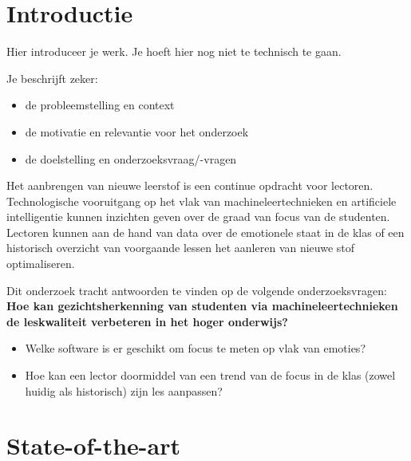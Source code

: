 
\section{Introductie} %
\label{sec:introductie}

Hier introduceer je werk. Je hoeft hier nog niet te technisch te gaan.

Je beschrijft zeker:

\begin{itemize}
  \item de probleemstelling en context
  \item de motivatie en relevantie voor het onderzoek
  \item de doelstelling en onderzoeksvraag/-vragen
\end{itemize}

Het aanbrengen van nieuwe leerstof is een continue opdracht voor lectoren. Technologische vooruitgang op het vlak van machineleertechnieken en artificiele intelligentie kunnen inzichten geven over de graad van focus van de studenten. Lectoren kunnen aan de hand van data over de emotionele staat in de klas of een historisch overzicht van voorgaande lessen het aanleren van nieuwe stof optimaliseren. 

Dit onderzoek tracht antwoorden te vinden op de volgende onderzoeksvragen: 
\textbf{Hoe kan gezichtsherkenning van studenten via machineleertechnieken de leskwaliteit verbeteren in het hoger onderwijs?}
\begin{itemize}
    \item Welke software is er geschikt om focus te meten op vlak van emoties?
    \item Hoe kan een lector doormiddel van een trend van de focus in de klas (zowel huidig als historisch) zijn les aanpassen?
\end{itemize}


\section{State-of-the-art}
\label{sec:state-of-the-art}

